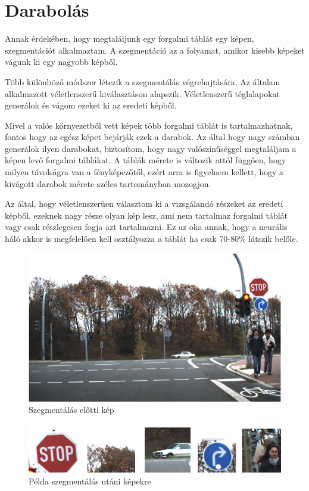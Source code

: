 \chapter{Darabolás}\label{ch:SEGMENT}

Annak érdekében, hogy megtaláljunk egy forgalmi táblát egy képen, szegmentációt alkalmaztam. A szegmentáció az a folyamat, amikor kisebb képeket vágunk ki egy nagyobb képből. \cite{7}

Több különböző módszer létezik a szegmentálás végrehajtására. Az általam alkalmazott véletlenszerű kiválasztáson alapszik. Véletlenszerű téglalapokat generálok és vágom ezeket ki az eredeti képből.

Mivel a valós környezetből vett képek több forgalmi táblát is tartalmazhatnak, fontos hogy az egész képet bejárják ezek a darabok. Az által hogy nagy számban generálok ilyen darabokat, biztosítom, hogy nagy valószínűséggel megtaláljam a képen levő forgalmi táblákat. A táblák mérete is változik attól függően, hogy milyen távolságra van a fényképezőtől, ezért arra is figyelnem kellett, hogy a kivágott darabok mérete széles tartományban mozogjon.

Az által, hogy véletlenszerűen választom ki a vizsgálandó részeket az eredeti képből, ezeknek nagy része olyan kép lesz, ami nem tartalmaz forgalmi táblát vagy csak részlegesen fogja azt tartalmazni. Ez az oka annak, hogy a neurális háló akkor is megfelelően kell osztályozza a táblát ha csak 70-80\% látszik belőle.

\begin{figure}[h]
\centering

\includegraphics[scale=0.3]{images/testImage2}
\caption{Szegmentálás előtti kép}

\label{fig:testImage2}
\end{figure}

\makeatletter
    \setlength{}
\makeatother

\begin{figure}[htbp]
\centering

\includegraphics[scale=1]{images/segments}
\caption{Példa szegmentálás utáni képekre}

\label{fig:segments}
\end{figure}